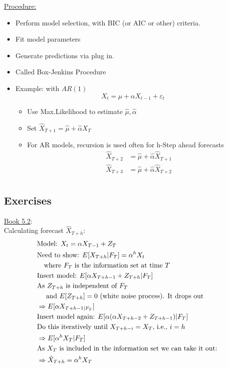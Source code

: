 \underline{Procedure:}
\begin{itemize}
    \item Perform model selection, with BIC (or AIC or other) criteria.
    \item Fit model parameters
    \item Generate predictions via plug in. 
    \item Called Box-Jenkins Procedure
    \item Example: with $AR(1)$
    \[X_t=\mu+\alpha X_{t-1}+\varepsilon_t \]
    \begin{itemize}
        \item Use Max.Likelihood to estimate $\hat{\mu}, \hat{\alpha}$
        \item Set $\hat{X}_{T+1}= \hat{\mu} + \hat{\alpha}X_T$
        \item For AR models, recursion is used often for h-Step ahead forecasts
        \begin{align*}
            \hat{X}_{T+2} &= \hat{\mu} +\hat{\alpha} \hat{X}_{T+1}\\
            \hat{X}_{T+3} &= \hat{\mu} +\hat{\alpha} \hat{X}_{T+2}\\
        \end{align*}
    \end{itemize}
\end{itemize}

\subsection{Exercises}

\underline{Book 5.2}: \\

\quad Calculating forecast $\hat{X}_{T+h}$:
\begin{align*}
   &\text{Model: } X_t = \alpha X_{T-1} + Z_T \\
   &\text{Need to show: } E[X_{T+h}|F_T] = \alpha^h X_t \\
   &\text{\quad where $F_T$ is the information set at time $T$} \\
   &\text{Insert model: } E[\alpha X_{T+h-1} + Z_{T+h}|F_T] \\
   &\text{As $Z_{T+h}$ is independent of $F_T$} \\
   &\text{ \quad and $E[Z_{T+h}]=0$ (white noise process). It drops out} \\
   &\Rightarrow E[\alpha X_{T+h-1|F_T}] \\
   &\text{Insert model again: } E[\alpha(\alpha X_{T+h-2} + Z_{T+h-1}) |F_T] \\
   &\text{Do this iteratively until $X_{T+h-i} = X_T$, i.e., $i=h$} \\
   &\Rightarrow E[\alpha^h X_T|F_T] \\
   &\text{As $X_T$ is included in the information set we can take it out:}\\
   &\Rightarrow \hat{X}_{T+h}= \alpha^h X_T
\end{align*}

